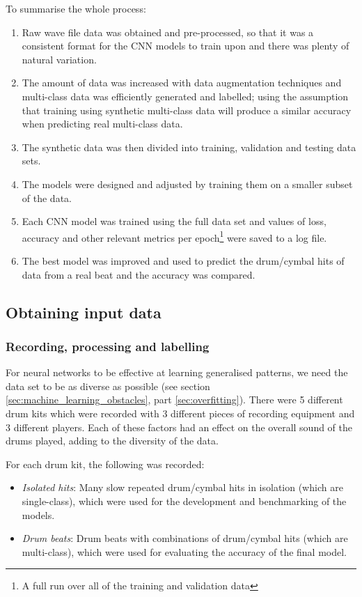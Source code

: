 \documentclass[12pt]{article}
\begin{document}
	To summarise the whole process:	
	\begin{enumerate}
	    \item Raw wave file data was obtained and pre-processed, so that it was a consistent format for the CNN models to train upon and there was plenty of natural variation.
	    \item The amount of data was increased with data augmentation techniques and multi-class data was efficiently generated and labelled; using the assumption that training using synthetic multi-class data will produce a similar accuracy when predicting real multi-class data.
	    \item The synthetic data was then divided into training, validation and testing data sets.
	    \item The models were designed and adjusted by training them on a smaller subset of the data.
	    \item Each CNN model was trained using the full data set and values of loss, accuracy and other relevant metrics per epoch\footnote{A full run over all of the training and validation data} were saved to a log file.
	    \item The best model was improved and used to predict the drum/cymbal hits of data from a real beat and the accuracy was compared.
	\end{enumerate}
	
	\subsection{Obtaining input data}
	\subsubsection{Recording, processing and labelling}
	
	For neural networks to be effective at learning generalised patterns, we need the data set to be as diverse as possible (see section \ref{sec:machine_learning_obstacles}, part \ref{sec:overfitting}). There were 5 different drum kits which were recorded with 3 different pieces of recording equipment and 3 different players. Each of these factors had an effect on the overall sound of the drums played, adding to the diversity of the data.\medskip
	
	For each drum kit, the following was recorded:
	\begin{itemize}
	    \item \textit{Isolated hits}: Many slow repeated drum/cymbal hits in isolation (which are single-class), which were used for the development and benchmarking of the models.
	    \item \textit{Drum beats}: Drum beats with combinations of drum/cymbal hits (which are multi-class), which were used for evaluating the accuracy of the final model. 
	\end{itemize} \medskip
	
\end{document}
